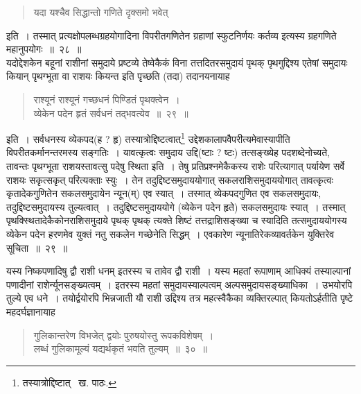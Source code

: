 \documentclass[11pt, openany]{book}
\begin{document}
\begin{quote}
{\qt यदा यश्चैव सिद्धान्तो गणिते दृक्समो भवेत्}
\end{quote}

\noindent इति~। तस्मात् प्रत्यक्षोपलब्धग्रहयोगादिना विपरीतगणितेन ग्रहाणां स्फुटनिर्णयः कर्तव्य इत्यस्य ग्रहगणिते महानुपयोगः~॥~२८~॥\\

यदोद्देशकेन बहूनां राशीनां समुदाये प्रष्टव्ये तेष्वेकैकं विना तत्तदितरसमुदायं पृथक् पृथगुद्दिश्य एतेषां समुदायः कियान् पृथग्भूता वा राशयः कियन्त इति पृच्छति (तदा) तदानयनायाह\textendash

\begin{quote}
{\ab राश्यूनं राश्यूनं गच्छधनं पिण्डितं पृथक्त्वेन~।\\
व्येकेन पदेन हृतं सर्वधनं तद्भवत्येव~॥~२९~॥}
\end{quote}
\begin{sloppypar} 
इति~। सर्वधनस्य व्येकपद(ह ? हृ) तस्यात्रोद्दिष्टत्वात्\renewcommand{\thefootnote}{१}\footnote{तस्यात्रोद्दिष्टात् \textendash\ ख. पाठः.} उद्देशकालापवैपरीत्यमेवास्यापीति विपरीतकर्मानन्तरमस्य सङ्गतिः~। यावत्कृत्वः समुदाय उद्दि(ष्टाः ? ष्टः) तत्सङ्ख्येह पदशब्देनोच्यते, तावन्तः पृथग्भूता राशयस्तावत्सु पदेषु स्थिता इति~। तेषु प्रतिप्रश्नमेकैकस्य राशेः परित्यागात्
पर्यायेण सर्वे राशयः सकृत्सकृत् परित्यक्ताः स्युः~। तेन तदुद्दिष्टसमुदाययोगात् सकलराशिसमुदाययोगात् तावत्कृत्वः कृतादेकगुणितेन सकलसमुदायेन न्यून(म्) एव स्यात्~। तस्मात् व्येकपदगुणित एव सकलसमुदायः, तदुद्दिष्टसमुदायस्य तुल्यत्वात्~। तदुद्दिष्टसमुदाययोगे (व्येकेन पदेन हृते) सकलसमुदायः स्यात्~। तस्मात् पृथक्स्थितादेकैकोनराशिसमुदाये पृथक् पृथक् त्यक्ते शिष्टं तत्तद्राशिसङ्ख्या च स्यादिति तत्समुदाययोगस्य व्येकेन पदेन हरणमेव युक्तं नतु सकलेन गच्छेनेति सिद्धम्~। एवकारेण न्यूनातिरेकव्यावर्तकेन युक्तिरेव सूचिता~॥~२९~॥\\
\end{sloppypar} 
\newpage

यस्य निष्कपणादिषु द्वौ राशी धनम् इतरस्य च तावेव द्वौ राशी~। यस्य महतां रूपाणाम् आधिक्यं तस्याल्पानां पणादीनां राशेर्न्यूनसङ्ख्यत्वम्~। इतरस्य महतां समुदायस्याल्पत्वम् अल्पसमुदायसङ्ख्याधिका~। उभयोरपि तुल्ये एव धने~। तयोर्द्वयोरपि भिन्नजाती यौ राशी उद्दिश्य तत्र महत्स्वैकैका व्यक्तिरल्पात् कियतोऽर्हतीति पृष्टे महदर्घज्ञानायाह\textendash

\begin{quote}
{\ab गुलिकान्तरेण विभजेत् द्वयोः पुरुषयोस्तु रूपकविशेषम्~।\\
लब्धं गुलिकामूल्यं यद्यर्थकृतं भवति तुल्यम्~॥~३०~॥}
\end{quote}
\end{document}
